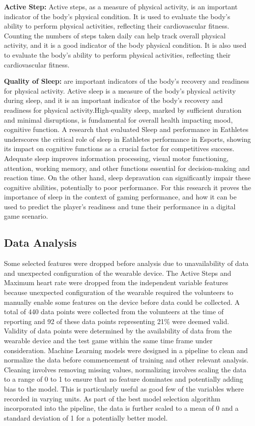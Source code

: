 \textbf{Active Step:} Active steps, as a measure of physical activity, is an important indicator of the body's physical condition. It is
used to evaluate the body's ability to perform physical activities, reflecting their cardiovascular fitness. Counting the numbers of
steps taken daily can help track overall physical activity, and it is a good indicator of the body physical condition. It is also used
to evaluate the body's ability to perform physical activities, reflecting their cardiovascular fitness.


\textbf{Quality of Sleep:} are important indicators of the body's recovery and readiness for physical activity. Active sleep is a
measure of the body's physical activity during sleep, and it is an important indicator of the body's recovery and readiness for
physical activity.High-quality sleep, marked by sufficient duration and minimal disruptions, is fundamental for overall health
impacting mood, cognitive function.  A research that evaluated Sleep and performance in Eathletes \cite{BONNAR2019647} underscores the
critical role of sleep in Eathletes performance in Esports, showing its impact on cognitive functions as a crucial factor for
competitives success. Adequate sleep improves information processing, visual motor functioning, attention, working memory, and other
functions essential for decision-making and reaction time. On the other hand, sleep depravation can significantly impair these
cognitive abilities, potentially to poor performance. For this research it proves the importance of sleep in the context of gaming
performance, and how it can be used to predict the player's readiness and tune their performance in a digital game scenario.




\subsection{Data Analysis}
Some selected features were dropped before analysis due to unavailability of data and unexpected configuration of the wearable device. The Active Steps and
Maximum heart rate were dropped from the independent variable features because unexpected configuration of the wearable required the volunteers
to manually enable some features on the device before data could be collected.
A total of 440 data points were collected from the volunteers at the time of reporting and 92 of these data points representing 21\% were deemed valid. 
Validity of data points were determined by the availability of data from the wearable device and the test game within the same time frame under 
consideration. 
Machine Learning models were designed in a pipeline to clean and normalize the data before commencement of training and other relevant analysis. 
Cleaning involves removing missing values, normalizing involves scaling the data to a range of 0 to 1 to ensure that no feature dominates and potentially 
adding bias to the model. This is particularly useful as good few of the variables where recorded in varying units. As part of the best model selection 
algorithm incorporated into the pipeline, the data is further scaled to a mean of 0 and a standard deviation of 1 for a potentially better model.

